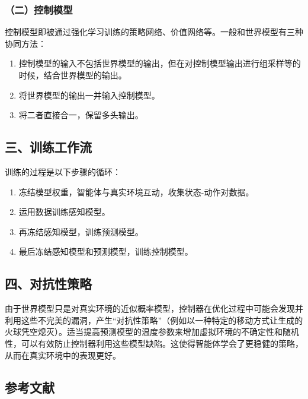 \hypertarget{ux4e8cux63a7ux5236ux6a21ux578b}{%
\subsubsection{（二）控制模型}\label{ux4e8cux63a7ux5236ux6a21ux578b}}

控制模型即被通过强化学习训练的策略网络、价值网络等。一般和世界模型有三种协同方法：

\begin{enumerate}
\def\labelenumi{\arabic{enumi}.}
\item
  控制模型的输入不包括世界模型的输出，但在对控制模型输出进行组采样等的时候，结合世界模型的输出。
\item
  将世界模型的输出一并输入控制模型。
\item
  将二者直接合一，保留多头输出。
\end{enumerate}

\hypertarget{ux4e09ux8badux7ec3ux5de5ux4f5cux6d41-3}{%
\subsection{三、训练工作流}\label{ux4e09ux8badux7ec3ux5de5ux4f5cux6d41-3}}

训练的过程是以下步骤的循环：

\begin{enumerate}
\def\labelenumi{\arabic{enumi}.}
\item
  冻结模型权重，智能体与真实环境互动，收集状态-动作对数据。
\item
  运用数据训练感知模型。
\item
  再冻结感知模型，训练预测模型。
\item
  最后冻结感知模型和预测模型，训练控制模型。
\end{enumerate}

\hypertarget{ux56dbux5bf9ux6297ux6027ux7b56ux7565}{%
\subsection{四、对抗性策略}\label{ux56dbux5bf9ux6297ux6027ux7b56ux7565}}

由于世界模型只是对真实环境的近似概率模型，控制器在优化过程中可能会发现并利用这些不完美的漏洞，产生``对抗性策略''（例如以一种特定的移动方式让生成的火球凭空熄灭）。适当提高预测模型的温度参数来增加虚拟环境的不确定性和随机性，可以有效防止控制器利用这些模型缺陷。这使得智能体学会了更稳健的策略，从而在真实环境中的表现更好。

\hypertarget{ux53c2ux8003ux6587ux732e-186}{%
\subsection{参考文献}\label{ux53c2ux8003ux6587ux732e-186}}

